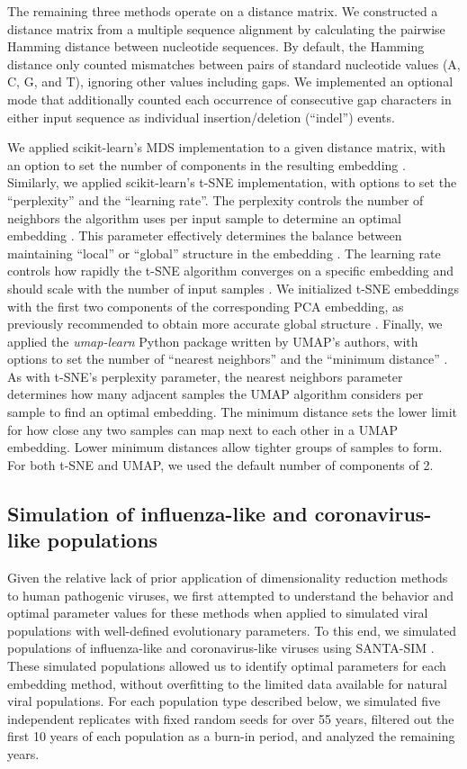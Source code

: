 \documentclass[10pt,letterpaper]{article}
\begin{document}
The remaining three methods operate on a distance matrix.
We constructed a distance matrix from a multiple sequence alignment by calculating the pairwise Hamming distance between nucleotide sequences.
By default, the Hamming distance only counted mismatches between pairs of standard nucleotide values (A, C, G, and T), ignoring other values including gaps.
We implemented an optional mode that additionally counted each occurrence of consecutive gap characters in either input sequence as individual insertion/deletion (``indel'') events.

We applied scikit-learn's MDS implementation to a given distance matrix, with an option to set the number of components in the resulting embedding \cite{Pedregosa2011}.
Similarly, we applied scikit-learn's t-SNE implementation, with options to set the ``perplexity'' and the ``learning rate''.
The perplexity controls the number of neighbors the algorithm uses per input sample to determine an optimal embedding \cite{maaten2008visualizing}.
This parameter effectively determines the balance between maintaining ``local'' or ``global'' structure in the embedding \cite{kobak_2019}.
The learning rate controls how rapidly the t-SNE algorithm converges on a specific embedding \cite{Jacobs1988,maaten2008visualizing} and should scale with the number of input samples \cite{Belkina2019}.
We initialized t-SNE embeddings with the first two components of the corresponding PCA embedding, as previously recommended to obtain more accurate global structure \cite{kobak_2019,kobak_2021}.
Finally, we applied the \textit{umap-learn} Python package written by UMAP's authors, with options to set the number of ``nearest neighbors'' and the ``minimum distance'' \cite{lel2018umap}.
As with t-SNE's perplexity parameter, the nearest neighbors parameter determines how many adjacent samples the UMAP algorithm considers per sample to find an optimal embedding.
The minimum distance sets the lower limit for how close any two samples can map next to each other in a UMAP embedding.
Lower minimum distances allow tighter groups of samples to form.
For both t-SNE and UMAP, we used the default number of components of 2.

\subsection*{Simulation of influenza-like and coronavirus-like populations}

Given the relative lack of prior application of dimensionality reduction methods to human pathogenic viruses, we first attempted to understand the behavior and optimal parameter values for these methods when applied to simulated viral populations with well-defined evolutionary parameters.
To this end, we simulated populations of influenza-like and coronavirus-like viruses using SANTA-SIM \cite{Jariani2019}.
These simulated populations allowed us to identify optimal parameters for each embedding method, without overfitting to the limited data available for natural viral populations.
For each population type described below, we simulated five independent replicates with fixed random seeds for over 55 years, filtered out the first 10 years of each population as a burn-in period, and analyzed the remaining years.
\end{document}
